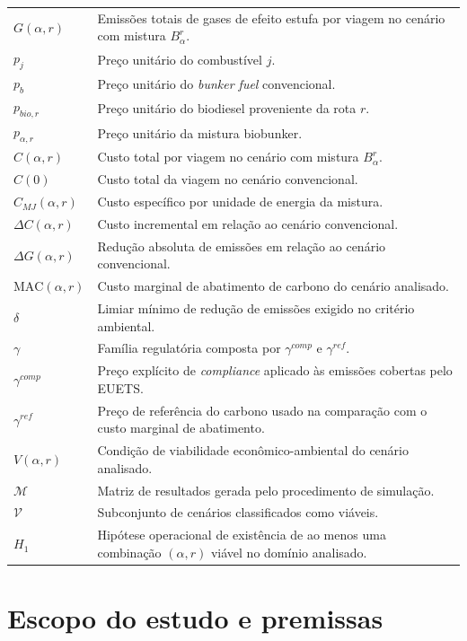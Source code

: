 \begin{table}[!ht]
\begin{tabular}{@{}L{1.8cm} L{12.8cm}@{}}
$G(\alpha,r)$ & Emissões totais de gases de efeito estufa por viagem no cenário com mistura $B_{\alpha}^{r}$. \\
$p_j$ & Preço unitário do combustível $j$. \\
$p_b$ & Preço unitário do \emph{bunker fuel} convencional. \\
$p_{bio,r}$ & Preço unitário do biodiesel proveniente da rota $r$. \\
$p_{\alpha,r}$ & Preço unitário da mistura biobunker. \\
$C(\alpha,r)$ & Custo total por viagem no cenário com mistura $B_{\alpha}^{r}$. \\
$C(0)$ & Custo total da viagem no cenário convencional. \\
$C_{MJ}(\alpha,r)$ & Custo específico por unidade de energia da mistura. \\
$\Delta C(\alpha,r)$ & Custo incremental em relação ao cenário convencional. \\
$\Delta G(\alpha,r)$ & Redução absoluta de emissões em relação ao cenário convencional. \\
$\mathrm{MAC}(\alpha,r)$ & Custo marginal de abatimento de carbono do cenário analisado. \\
$\delta$ & Limiar mínimo de redução de emissões exigido no critério ambiental. \\
$\gamma$ & Família regulatória composta por $\gamma^{comp}$ e $\gamma^{ref}$. \\
$\gamma^{comp}$ & Preço explícito de \emph{compliance} aplicado às emissões cobertas pelo \gls{EUETS}. \\
$\gamma^{ref}$ & Preço de referência do carbono usado na comparação com o custo marginal de abatimento. \\
$V(\alpha,r)$ & Condição de viabilidade econômico-ambiental do cenário analisado. \\
$\mathcal{M}$ & Matriz de resultados gerada pelo procedimento de simulação. \\
$\mathcal{V}$ & Subconjunto de cenários classificados como viáveis. \\
$H_1$ & Hipótese operacional de existência de ao menos uma combinação $(\alpha,r)$ viável no domínio analisado. \\
\hline
\end{tabular}
\end{table}

\section{Escopo do estudo e premissas}


